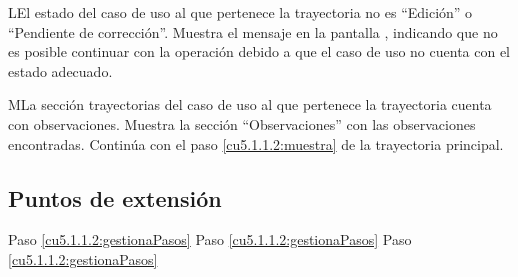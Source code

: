  \begin{UCtrayectoriaA}{L}{El estado del caso de uso al que pertenece la trayectoria no es ``Edición'' o ``Pendiente de corrección''.}
    \UCpaso[\UCsist] Muestra el mensaje  en la pantalla , indicando que no es posible
	continuar con la operación debido a que el caso de uso no cuenta con el estado adecuado.
 \end{UCtrayectoriaA}
 \begin{UCtrayectoriaA}{M}{La sección trayectorias del caso de uso al que pertenece la trayectoria cuenta con observaciones.}
    \UCpaso[\UCsist] Muestra la sección ``Observaciones'' con las observaciones encontradas.
	\UCpaso[] Continúa con el paso \ref{cu5.1.1.2:muestra} de la trayectoria principal.
 \end{UCtrayectoriaA}


\subsection{Puntos de extensión}

	{Paso \ref{cu5.1.1.2:gestionaPasos}}
	{}
	{Paso \ref{cu5.1.1.2:gestionaPasos}}
	{}	
	{Paso \ref{cu5.1.1.2:gestionaPasos}}
	{}
  